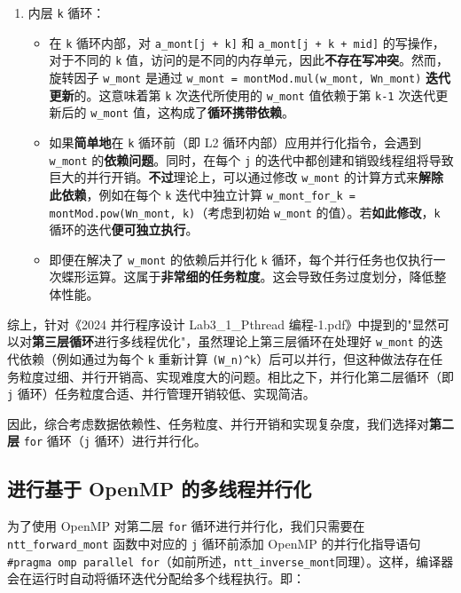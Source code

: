 \documentclass[a4paper]{article}
\begin{document}
\begin{enumerate}
\item 内层 \texttt{k} 循环：
  \begin{itemize}
    \item 在 \texttt{k} 循环内部，对 \texttt{a\_mont[j + k]} 和 \texttt{a\_mont[j + k + mid]} 的写操作，对于不同的 \texttt{k} 值，访问的是不同的内存单元，因此\textbf{不存在写冲突}。然而，旋转因子 \texttt{w\_mont} 是通过 \texttt{w\_mont = montMod.mul(w\_mont, Wn\_mont)} \textbf{迭代更新}的。这意味着第 \texttt{k} 次迭代所使用的 \texttt{w\_mont} 值依赖于第 \texttt{k-1} 次迭代更新后的 \texttt{w\_mont} 值，这构成了\textbf{循环携带依赖}。
    \item 如果\textbf{简单地}在 \texttt{k} 循环前（即 L2 循环内部）应用并行化指令，会遇到 \texttt{w\_mont} 的\textbf{依赖问题}。同时，在每个 \texttt{j} 的迭代中都创建和销毁线程组将导致巨大的并行开销。\textbf{不过}理论上，可以通过修改 \texttt{w\_mont} 的计算方式来\textbf{解除此依赖}，例如在每个 \texttt{k} 迭代中独立计算 \texttt{w\_mont\_for\_k = montMod.pow(Wn\_mont, k)}（考虑到初始 \texttt{w\_mont} 的值）。若\textbf{如此修改}，\texttt{k} 循环的迭代\textbf{便可独立执行}。
    \item 即便在解决了 \texttt{w\_mont} 的依赖后并行化 \texttt{k} 循环，每个并行任务也仅执行一次蝶形运算。这属于\textbf{非常细的任务粒度}。这会导致任务过度划分，降低整体性能。
  \end{itemize}
\end{enumerate}

综上，针对《2024 并行程序设计 Lab3\_1\_Pthread 编程-1.pdf》中提到的"显然可以对\textbf{第三层循环}进行多线程优化"，虽然理论上第三层循环在处理好 \texttt{w\_mont} 的迭代依赖（例如通过为每个 \texttt{k} 重新计算 \texttt{(W\_n)\^{}k}）后可以并行，但这种做法存在任务粒度过细、并行开销高、实现难度大的问题。相比之下，并行化第二层循环（即 \texttt{j} 循环）任务粒度合适、并行管理开销较低、实现简洁。

因此，综合考虑数据依赖性、任务粒度、并行开销和实现复杂度，我们选择对\textbf{第二层} \texttt{for} 循环（\texttt{j} 循环）进行并行化。

\subsection{进行基于 OpenMP 的多线程并行化}

为了使用 OpenMP 对第二层 \texttt{for} 循环进行并行化，我们只需要在 \texttt{ntt\_forward\_mont} 函数中对应的 \texttt{j} 循环前添加 OpenMP 的并行化指导语句 \texttt{\#pragma omp parallel for}（如前所述，\texttt{ntt\_inverse\_mont}同理）。这样，编译器会在运行时自动将循环迭代分配给多个线程执行。即：
\end{document}
